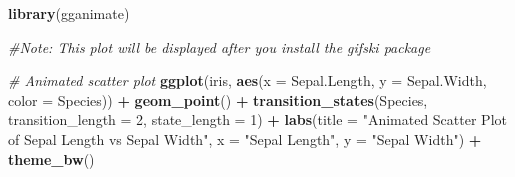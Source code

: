 \documentclass[
]{book}
\newenvironment{Shaded}{\begin{snugshade}}{\end{snugshade}}
\newcommand{\AttributeTok}[1]{\textcolor[rgb]{0.13,0.29,0.53}{#1}}
\newcommand{\CommentTok}[1]{\textcolor[rgb]{0.56,0.35,0.01}{\textit{#1}}}
\newcommand{\DecValTok}[1]{\textcolor[rgb]{0.00,0.00,0.81}{#1}}
\newcommand{\FunctionTok}[1]{\textcolor[rgb]{0.13,0.29,0.53}{\textbf{#1}}}
\newcommand{\NormalTok}[1]{#1}
\newcommand{\SpecialCharTok}[1]{\textcolor[rgb]{0.81,0.36,0.00}{\textbf{#1}}}
\newcommand{\StringTok}[1]{\textcolor[rgb]{0.31,0.60,0.02}{#1}}
\begin{document}
\begin{Shaded}
\begin{Highlighting}[]
\FunctionTok{library}\NormalTok{(gganimate)}

\CommentTok{\#Note: This plot will be displayed after you install the gifski package}

\CommentTok{\# Animated scatter plot}
\FunctionTok{ggplot}\NormalTok{(iris, }\FunctionTok{aes}\NormalTok{(}\AttributeTok{x =}\NormalTok{ Sepal.Length, }\AttributeTok{y =}\NormalTok{ Sepal.Width, }\AttributeTok{color =}\NormalTok{ Species)) }\SpecialCharTok{+} 
  \FunctionTok{geom\_point}\NormalTok{() }\SpecialCharTok{+}
  \FunctionTok{transition\_states}\NormalTok{(Species, }\AttributeTok{transition\_length =} \DecValTok{2}\NormalTok{, }\AttributeTok{state\_length =} \DecValTok{1}\NormalTok{) }\SpecialCharTok{+}
  \FunctionTok{labs}\NormalTok{(}\AttributeTok{title =} \StringTok{"Animated Scatter Plot of Sepal Length vs Sepal Width"}\NormalTok{,}
       \AttributeTok{x =} \StringTok{"Sepal Length"}\NormalTok{, }\AttributeTok{y =} \StringTok{"Sepal Width"}\NormalTok{) }\SpecialCharTok{+}
  \FunctionTok{theme\_bw}\NormalTok{()}
\end{Highlighting}
\end{Shaded}
\end{document}
